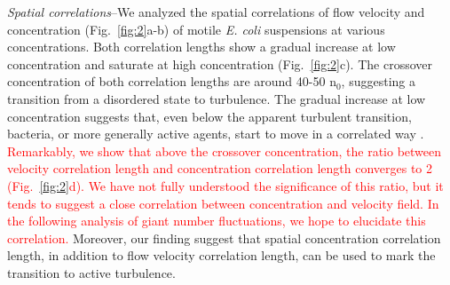 \documentclass[twocolumn,aps,prl,amsmath,amssymb,longbibliography]{revtex4-1}
\begin{document}
\textit{Spatial correlations}--We analyzed the spatial correlations of flow velocity and concentration (Fig.~\ref{fig:2}a-b) of motile \textit{E. coli} suspensions at various concentrations. Both correlation lengths show a gradual increase at low concentration and saturate at high concentration (Fig.~\ref{fig:2}c). The crossover concentration of both correlation lengths are around 40-50 n$_0$, suggesting a transition from a disordered state to turbulence. The gradual increase at low concentration suggests that, even below the apparent turbulent transition, bacteria, or more generally active agents, start to move in a correlated way \cite{PhysRevLett.119.028005}. \textcolor{red}{Remarkably, we show that above the crossover concentration, the ratio between velocity correlation length and concentration correlation length converges to 2 (Fig.~\ref{fig:2}d). We have not fully understood the significance of this ratio, but it tends to suggest a close correlation between concentration and velocity field. In the following analysis of giant number fluctuations, we hope to elucidate this correlation.} Moreover, our finding suggest that spatial concentration correlation length, in addition to flow velocity correlation length\cite{Wensink14308, PhysRevLett.110.228102}, can be used to mark the transition to active turbulence.
\end{document}
